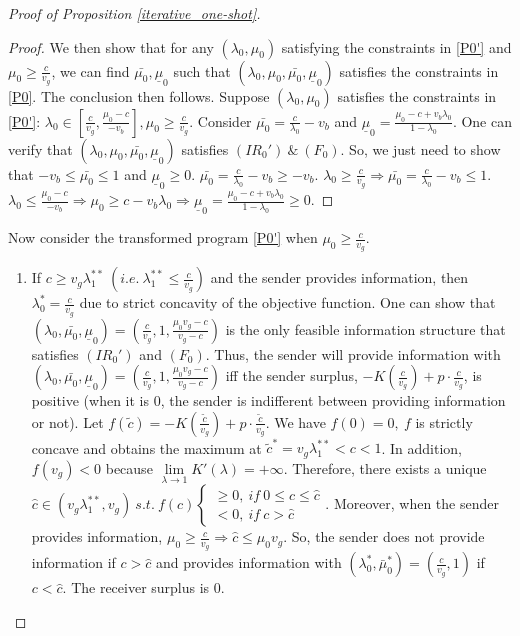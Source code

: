 \documentclass[11pt]{extarticle}
\newcommand{\ra}{\Rightarrow}
\begin{document}
\begin{proof}[Proof of Proposition \ref{iterative_one-shot}]
\begin{proof}
		We then show that for any $(\lambda_0,\mu_0)$ satisfying the constraints in \eqref{P0'} and $\mu_0 \geq \frac{c}{v_g}$, we can find $\bar{\mu_0},\underline{\mu}_0$ such that $(\lambda_0,\mu_0,\bar{\mu_0},\underline{\mu}_0)$ satisfies the constraints in \eqref{P0}. The conclusion then follows. Suppose $(\lambda_0,\mu_0)$ satisfies the constraints in \eqref{P0'}: $\lambda_0 \in \left[\frac{c}{v_g}, \frac{\mu_0-c}{-v_b}\right], \mu_0 \geq \frac{c}{v_g}$. Consider $\bar{\mu_0} = \frac{c}{\lambda_0}-v_b$ and $\underline{\mu}_0  = \frac{\mu_0-c+v_b \lambda_0}{1-\lambda_0}$. One can verify that $(\lambda_0,\mu_0,\bar{\mu_0},\underline{\mu}_0)$ satisfies $(IR_0')~\&~(F_0)$. So, we just need to show that $-v_b \leq \bar{\mu_0} \leq 1$ and $\underline{\mu}_0 \geq 0$. $\bar{\mu_0} = \frac{c}{\lambda_0}-v_b\geq -v_b$. $\lambda_0 \geq \frac{c}{v_g} \ra \bar{\mu_0} = \frac{c}{\lambda_0}-v_b \leq 1$. $\lambda_0 \leq \frac{\mu_0-c}{-v_b} \ra \mu_0 \geq c -v_b \lambda_0 \ra \underline{\mu}_0  = \frac{\mu_0-c + v_b\lambda_0}{1-\lambda_0} \geq 0$.
	\end{proof}
	Now consider the transformed program \eqref{P0'} when $\mu_0 \geq \frac{c}{v_g}$.
	\begin{enumerate}
		\item If $c \geq v_g \lambda_1^{**}~(i.e.~ \lambda_1^{**} \leq \frac{c}{v_g})$ and the sender provides information, then $\lambda_0^* = \frac{c}{v_g}$ due to strict concavity of the objective function. One can show that $(\lambda_0,\bar{\mu_0},\underline{\mu}_0) = (\frac{c}{v_g},1,\frac{\mu_0v_g-c}{v_g-c})$ is the only feasible information structure that satisfies $(IR_0')$ and $(F_0)$. Thus, the sender will provide information with $(\lambda_0,\bar{\mu_0},\underline{\mu}_0) = (\frac{c}{v_g},1,\frac{\mu_0v_g-c}{v_g-c})$ iff the sender surplus, $-K(\frac{c}{v_g})+p\cdot \frac{c}{v_g}$, is positive (when it is 0, the sender is indifferent between providing information or not). Let $f(\tilde{c}) = -K(\frac{\tilde{c}}{v_g})+p\cdot \frac{\tilde{c}}{v_g}$. We have $f(0) = 0,~f$ is strictly concave and obtains the maximum at $\tilde{c}^*=v_g\lambda_1^{**} < c < 1$. In addition, $f(v_g)<0$ because $\lim\limits_{\lambda \rightarrow 1} K'(\lambda)=+\infty$. Therefore, there exists a unique $\widehat{c} \in \left(v_g\lambda_1^{**},v_g\right)~s.t.~f(c)
		\begin{cases}
		\geq 0,~if~0\leq c \leq \widehat{c}\\
		< 0,~if~c > \widehat{c}
		\end{cases}$. Moreover, when the sender provides information, $\mu_0 \geq \frac{c}{v_g} \ra \widehat{c} \leq \mu_0 v_g$. So, the sender does not provide information if $c > \widehat{c}$ and provides information with $(\lambda^*_0,\bar{\mu}_0^*) = (\frac{c}{v_g},1)$ if $c < \widehat{c}$. The receiver surplus is 0.
		

\end{enumerate}
\end{proof}
\end{document}
